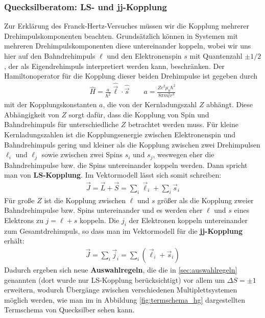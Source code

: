 \documentclass[11pt, a4paper]{article}
\begin{document}
\subsubsection{Quecksilberatom: LS- und jj-Kopplung}
Zur Erklärung des Franck-Hertz-Versuches müssen wir die Kopplung mehrerer Drehimpulskomponenten beachten.
Grundsätzlich können in Systemen mit mehreren Drehimpulskomponenten diese untereinander koppeln, wobei wir uns hier auf den Bahndrehimpuls $\ell$ und den Elektronenspin $s$ mit Quantenzahl $\pm1/2$, der als Eigendrehimpuls interpretiert werden kann, beschränken.
Der Hamiltonoperator für die Kopplung dieser beiden Drehimpulse ist gegeben durch
\begin{align*}
\hat{H}=\frac{a}{\hbar^2}\hat{\vec{\ell}}\cdot\hat{\vec{s}}\qquad a=\frac{Ze^2\mu_0\hbar^2}{8\pi m_e^2 r^3}
\end{align*}
mit der Kopplungskonstanten $a$, die von der Kernladungszahl $Z$ abhängt.
Diese Abhängigkeit von $Z$ sorgt dafür, dass die Kopplung von Spin und Bahndrehimpuls für unterschiedliche $Z$ betrachtet werden muss.
Für kleine Kernladungszahlen ist die Kopplungsenergie zwischen Elektronenspin und Bahndrehimpuls gering und kleiner als die Kopplung zwischen zwei Drehimpulsen $\ell_i$ und $\ell_j$ sowie zwischen zwei Spins $s_i$ und $s_j$, weswegen eher die Bahndrehimpulse bzw. die Spins untereinander koppeln werden.
Dann spricht man von \textbf{LS-Kopplung}.
Im Vektormodell lässt sich somit schreiben:
\begin{align*}
\vec{J}=\vec{L}+\vec{S}=\sum_i\vec{\ell}_i+\sum_i\vec{s}_i
\end{align*}
Für große $Z$ ist die Kopplung zwischen $\ell$ und $s$ größer als die Kopplung zweier Bahndrehimpulse bzw. Spins untereinander und es werden eher $\ell$ und $s$ eines Elektrons zu $j=\ell+s$ koppeln.
Die $j_i$ der Elektronen koppeln untereinander zum Gesamtdrehimpuls, so dass man im Vektormodell für die \textbf{jj-Kopplung} erhält:
\begin{align*}
\vec{J}=\sum_i\vec{j}_i=\sum_i\left(\vec{\ell}_i+\vec{s}_i\right)
\end{align*}
Dadurch ergeben sich neue \textbf{Auswahlregeln}, die die in \ref{sec:auswahlregeln} genannten (dort wurde nur LS-Kopplung berücksichtigt) vor allem um $\Delta S=\pm1$ erweitern, wodurch Übergänge zwischen verschiedenen Multiplettsystemen möglich werden, wie man im in Abbildung \ref{fig:termschema_hg} dargestellten Termschema von Quecksilber sehen kann.
\end{document}
